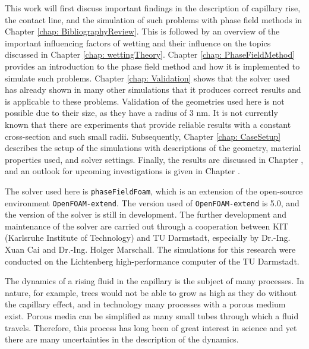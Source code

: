 This work will first discuss important findings in the description of capillary rise, the contact line, and the simulation of such problems with phase field methods in Chapter \ref{chap: BibliographyReview}. This is followed by an overview of the important influencing factors of wetting and their influence on the topics discussed in Chapter \ref{chap: wettingTheory}. Chapter \ref{chap: PhaseFieldMethod} provides an introduction to the phase field method and how it is implemented to simulate such problems. Chapter \ref{chap: Validation} shows that the solver used has already shown in many other simulations that it produces correct results and is applicable to these problems. Validation of the geometries used here is not possible due to their size, as they have a radius of 3 nm. It is not currently known that there are experiments that provide reliable results with a constant cross-section and such small radii. Subsequently, Chapter \ref{chap: CaseSetup} describes the setup of the simulations with descriptions of the geometry, material properties used, and solver settings. Finally, the results are discussed in Chapter , and an outlook for upcoming investigations is given in Chapter .

The solver used here is \texttt{phaseFieldFoam}, which is an extension of the open-source environment \texttt{OpenFOAM-extend}. The version used of \texttt{OpenFOAM-extend} is 5.0, and the version of the solver is still in development. The further development and maintenance of the solver are carried out through a cooperation between KIT (Karlsruhe Institute of Technology) and TU Darmstadt, especially by Dr.-Ing. Xuan Cai and Dr.-Ing. Holger Marschall. The simulations for this research were conducted on the Lichtenberg high-performance computer of the TU Darmstadt.





The dynamics of a rising fluid in the capillary is the subject of many processes. In nature, for example, trees would not be able to grow as high as they do without the capillary effect, and in technology many processes with a porous medium exist. Porous media can be simplified as many small tubes through which a fluid travels. Therefore, this process has long been of great interest in science and yet there are many uncertainties in the description of the dynamics.   

